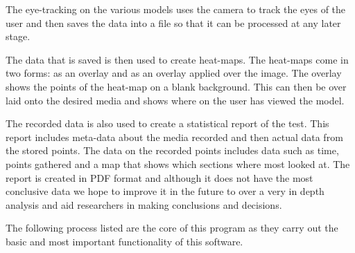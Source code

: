 The eye-tracking on the various models uses the camera to track the eyes of the user and then saves the data into a file so that it can be processed at any later stage.

The data that is saved is then used to create heat-maps. The heat-maps come in two forms: as an overlay and as an overlay applied over the image. The overlay shows the points of the heat-map on a blank background. This can then be over laid onto the desired media and shows where on the user has viewed the model.

The recorded data is also used to create a statistical report of the test. This report includes meta-data about the media recorded and then actual data from the stored points. The data on the recorded points includes data such as time, points gathered and a map that shows which sections where most looked at. The report is created in PDF format and although it does not have the most conclusive data we hope to improve it in the future to over a very in depth analysis and aid researchers in making conclusions and decisions.

The following process listed are the core of this program as they carry out the basic and most important functionality of this software.
